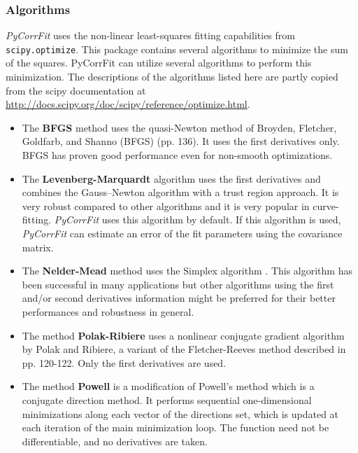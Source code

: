 \subsubsection{Algorithms}
\label{sec:theor.alg}
\textit{PyCorrFit} uses the non-linear least-squares fitting capabilities from \texttt{scipy.optimize}. This package contains several algorithms to minimize the sum of the squares. 
PyCorrFit can utilize several algorithms to perform this minimization. The descriptions of the algorithms listed here are partly copied from the scipy documentation at \url{http://docs.scipy.org/doc/scipy/reference/optimize.html}. 
\begin{itemize}
\item The \textbf{BFGS} method uses the quasi-Newton method of Broyden, Fletcher, Goldfarb, and Shanno (BFGS) \cite{Nocedal2006} (pp. 136). It uses the first derivatives only. BFGS has proven good performance even for non-smooth optimizations.
\item The \textbf{Levenberg-Marquardt} algorithm \cite{Levenberg1944} uses the first derivatives and combines the Gauss–Newton algorithm with a trust region approach. It is very robust compared to other algorithms and it is very popular in curve-fitting. \textit{PyCorrFit} uses this algorithm by default. If this algorithm is used, \textit{PyCorrFit} can estimate an error of the fit parameters using the covariance matrix.
\item The \textbf{Nelder-Mead} method uses the Simplex algorithm \cite{Nelder1965,Wright1996}. This algorithm has been successful in many applications but other algorithms using the first and/or second derivatives information might be preferred for their better performances and robustness in general.
\item The method \textbf{Polak-Ribiere} uses a nonlinear conjugate gradient algorithm by Polak and Ribiere, a variant of the Fletcher-Reeves method described in \cite{Nocedal2006} pp.
120-122. Only the first derivatives are used.
\item The method \textbf{Powell} is a modification of Powell's method \cite{Powell1964, Press} which is a conjugate direction method. It performs sequential one-dimensional minimizations along each vector of the directions set, which is updated at each iteration of the main minimization loop. The function need not be differentiable, and no derivatives are taken.
\end{itemize}


